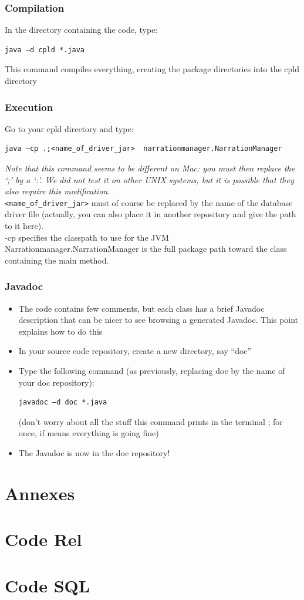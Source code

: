 \documentclass[a4paper ,12pt,french]{article}
\begin{document}
\subsubsection{Compilation}

In the directory containing the code, type:
\begin{verbatim}
java –d cpld *.java
\end{verbatim}
This command compiles everything, creating the package directories into the cpld directory
\subsubsection{Execution}
Go to your cpld directory and type:

\begin{verbatim}
java –cp .;<name_of_driver_jar>  narrationmanager.NarrationManager
\end{verbatim}

\textit{Note that this command seems to be different on Mac: you must then replace the ‘;’ by a ‘:’. We did not test it on other UNIX systems, but it is possible that they also require this modification.}\\

\texttt{<name\_of\_driver\_jar>} must of course be replaced by the name of the database driver file (actually, you can also place it in another repository and give the path to it here).\\ 

-cp specifies the classpath to use for the JVM\\

Narrationmanager.NarrationManager is the full package path toward the class containing the main method.

\subsubsection{Javadoc}


\begin{itemize}
\item The code contains few comments, but each class has a brief Javadoc description that can be nicer to see browsing a generated Javadoc. This point explains how to do this
\item In your source code repository, create a new directory, say “doc”
\item Type the following command (as previously, replacing doc by the name of your doc repository):
\begin{verbatim}
javadoc –d doc *.java
\end{verbatim}
(don’t worry about all the stuff this command prints in the terminal ; for once, if means everything is going fine)
\item The Javadoc is now in the doc repository!
\end{itemize}
\newpage

\section*{Annexes}
\appendix

\section{Code Rel}

\newpage
\section{Code SQL}

\end{document}
